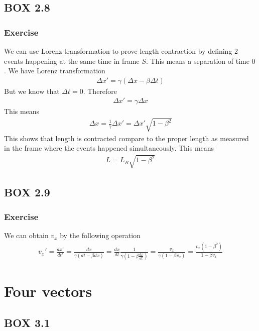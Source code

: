 \documentclass[12pt]{book}
\newcommand{\dydx}[2]{\frac{d #1}{d #2}}
\newcommand{\paren}[1]{\left( #1 \right)}
\begin{document}
    \subsection{BOX 2.8}
        \subsubsection{Exercise}
        We can use Lorenz transformation to prove length contraction by defining 2 events happening at the same time in frame $S$. This means a separation of time $0$. We have Lorenz transformation
        \begin{align}
        \Delta x' = \gamma\paren{\Delta x - \beta\Delta t}
        \end{align}
        But we know that $\Delta t = 0$. Therefore
        \begin{align}
        \Delta x' = \gamma\Delta x
        \end{align}
        This means
        \begin{align}
        \Delta x = \frac{1}{\gamma}\Delta x' = \Delta x'\sqrt{1-\beta^2}
        \end{align}
        This shows that length is contracted compare to the proper length as measured in the frame where the events happened simultaneously. This means
        \begin{align}
        L = L_R\sqrt{1-\beta^2}
        \end{align}

    \subsection{BOX 2.9}
        \subsubsection{Exercise}
        We can obtain $v_x$ by the following operation
        \begin{align}
        v_x' = \dydx{x'}{t'} = \frac{dx}{\gamma\paren{dt - \beta dx}} = \frac{dx}{dt}\frac{1}{\gamma\paren{1-\beta\dydx{x}{t}}} = \frac{v_x}{\gamma\paren{1-\beta v_x}} = \frac{v_x\paren{1-\beta^2}}{1-\beta v_x}
        \end{align}


    \section{Four vectors}
        \subsection{BOX 3.1}
\end{document}
